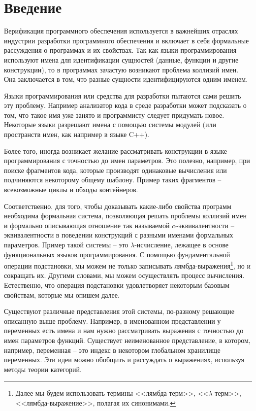 \section*{Введение}

Верификация программного обеспечения используется в важнейших отраслях индустрии разработки программного обеспечения и включает в себя формальные рассуждения о программах и их свойствах. Так как языки программирования используют имена для идентификации сущностей (данные, функции и другие конструкции), то в программах зачастую возникают проблема коллизий имен. Она заключается в том, что разные сущности идентифицируются одним именем.

Языки программирования или средства для разработки пытаются сами решить эту проблему. Например анализатор кода в среде разработки может подсказать о том, что такое имя уже занято и программисту следует придумать новое. Некоторые языки разрешают имена с помощью системы модулей (или пространств имен, как например в языке C++).

Более того, иногда возникает желание рассматривать конструкции в языке программирования с точностью до имен параметров. Это полезно, например, при поиске фрагментов кода, которые производят одинаковые вычисления или подчиняются некоторому общему шаблону. Пример таких фрагментов -- всевозможные циклы и обходы контейнеров.

Соответственно, для того, чтобы доказывать какие-либо свойства программ необходима формальная система, позволяющая решать проблемы коллизий имен и формально описывающая отношение так называемой $\alpha$-эквивалентности -- эквивалентности в поведении конструкций с разными именами формальных параметров. Пример такой системы -- это $\lambda$-исчисление, лежащее в основе функциональных языков программирования. С помощью фундаментальной операции подстановки, мы можем не только записывать лямбда-выражения\footnote{Далее мы будем использовать термины <<лямбда-терм>>, <<$\lambda$-терм>>, <<лямбда-выражение>>, полагая их синонимами.}, но и сокращать их. Другими словами, мы можем осуществлять процесс вычисления. Естественно, что операция подстановки удовлетворяет некоторым базовым свойствам, которые мы опишем далее.

Существуют различные представления этой системы, по-разному решающие описанную выше проблему. Например, в именованном представлении у переменных есть имена и нам нужно рассматривать выражения с точностью до имен параметров функций. Существует неименованное представление, в котором, например, переменная -- это индекс в некотором глобальном хранилище переменных. Эти идеи можно обобщить и рассуждать о выражениях, используя методы теории категорий.


